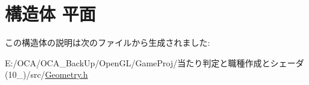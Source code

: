 \hypertarget{struct_xE5_xB9_xB3_xE9_x9D_xA2}{\section{構造体 平面}
\label{struct_xE5_xB9_xB3_xE9_x9D_xA2}
}


この構造体の説明は次のファイルから生成されました\-:\begin{DoxyCompactItemize}
\item 
E\-:/\-O\-C\-A/\-O\-C\-A\-\_\-\-Back\-Up/\-Open\-G\-L/\-Game\-Proj/当たり判定と職種作成とシェーダ(10\-\_)/src/\hyperlink{_geometry_8h}{Geometry.\-h}\end{DoxyCompactItemize}

